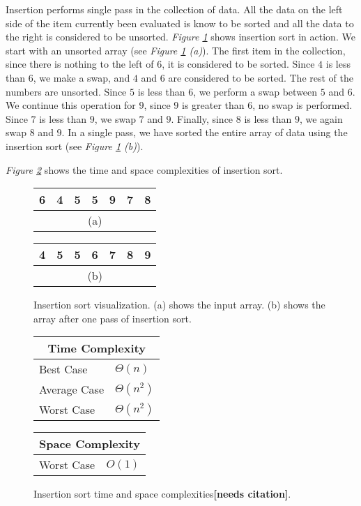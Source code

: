 Insertion performs single pass in the collection of data. All the data on the left side of the item currently been evaluated is know to be sorted and all the data to the right is considered to be unsorted. \textit{Figure \ref{fig:insertionsort_ex}} shows insertion sort in action. We start with an unsorted array (see \textit{Figure \ref{fig:insertionsort_ex} (a)}). The first item in the collection, since there is nothing to the left of $6$, it is considered to be sorted. Since $4$ is less than $6$, we make a swap, and $4$ and $6$ are considered to be sorted. The rest of the numbers are unsorted. Since $5$ is less than $6$, we perform a swap between $5$ and $6$. We continue this operation for $9$, since $9$ is greater than $6$, no swap is performed. Since $7$ is less than $9$, we swap $7$ and $9$. Finally, since $8$ is less than $9$, we again swap $8$ and $9$. In a single pass, we have sorted the entire array of data using the insertion sort (see \textit{Figure \ref{fig:insertionsort_ex} (b)}).

\textit{Figure \ref{fig:insertionsort}} shows the time and space complexities of insertion sort.

\begin{figure}[!ht]
    \centering
    \begin{tabular}{|c|c|c|c|c|c|c|}
    \hline
    6 & 4 & 5 & 5 & 9 & 7 & 8 \\
    \hline
    \multicolumn{7}{c}{(a)} \\
    \end{tabular}
    \quad\quad
    \begin{tabular}{|c|c|c|c|c|c|c|}
    \hline
    4 & 5 & 5 & 6 & 7 & 8 & 9 \\
    \hline
    \multicolumn{7}{c}{(b)} \\
    \end{tabular}
    
    \caption{Insertion sort visualization. (a) shows the input array. (b) shows the array after one pass of insertion sort.}
    \label{fig:insertionsort_ex}
\end{figure}

\begin{figure}[!ht]
    \centering
    \begin{tabular}{l|l}
    \multicolumn{2}{c}{\textbf{Time Complexity}} \\
    \hline
    Best Case    & $\Theta(n)$ \\
    Average Case & $\Theta(n^2)$ \\
    Worst Case   & $\Theta(n^2)$ \\
    \end{tabular}
    \quad\quad
    \begin{tabular}{l|l}
    \multicolumn{2}{c}{\textbf{Space Complexity}} \\
    \hline
    Worst Case   & $O(1)$ \\
    \end{tabular}
    
    \caption{Insertion sort time\cite{clrs2009} and space complexities\textbf{[needs citation]}.}
    \label{fig:insertionsort}
\end{figure}


